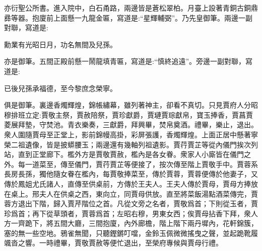\begin{parag}
    亦衍聖公所書。進入院中，白石甬路，兩邊皆是蒼松翠柏。月臺上設著青銅古銅鼎彞等器。抱廈前上面懸一九龍金匾，寫道是:“星輝輔弼”。乃先皇御筆。兩邊一副對聯，寫道是:
\end{parag}


\begin{poem}
    \begin{pl}勳業有光昭日月，功名無間及兒孫。\end{pl}

\end{poem}


\begin{parag}
    亦是御筆。五間正殿前懸一鬧龍填青匾，寫道是:“慎終追遠”。旁邊一副對聯，寫道是:
\end{parag}


\begin{poem}
    \begin{pl}已後兒孫承福德，至今黎庶念榮寧。\end{pl}

\end{poem}


\begin{parag}
    俱是御筆。裏邊香燭輝煌，錦帳繡幕，雖列著神主，卻看不真切。只見賈府人分昭穆排班立定:賈敬主祭，賈赦陪祭，賈珍獻爵，賈璉賈琮獻帛，寶玉捧香，賈菖賈菱展拜墊，守焚池。青衣樂奏，三獻爵，拜興畢，焚帛奠酒。禮畢，樂止，退出。衆人圍隨賈母至正堂上，影前錦幔高掛，彩屏張護，香燭輝煌。上面正居中懸著寧榮二祖遺像，皆是披蟒腰玉；兩邊還有幾軸列祖遺影。賈荇賈芷等從內儀門挨次列站，直到正堂廊下。檻外方是賈敬賈赦，檻內是各女眷。衆家人小廝皆在儀門之外。每一道菜至，傳至儀門，賈荇賈芷等便接了，按次傳至階上賈敬手中。賈蓉系長房長孫，獨他隨女眷在檻內，每賈敬捧菜至，傳於賈蓉，賈蓉便傳於他妻子，又傳於鳳姐尤氏諸人，直傳至供桌前，方傳於王夫人。王夫人傳於賈母，賈母方捧放在桌上。邢夫人在供桌之西，東向立，同賈母供放。直至將菜飯湯點酒菜傳完，賈蓉方退出下階，歸入賈芹階位之首。凡從文旁之名者，賈敬爲首；下則從玉者，賈珍爲首；再下從草頭者，賈蓉爲首；左昭右穆，男東女西；俟賈母拈香下拜，衆人方一齊跪下，將五間大廳，三間抱廈，內外廊檐，階上階下兩丹墀內，花軒錦簇，塞的無一些空地。鴉雀無聞，只聽鏗鏘叮噹，金鈴玉佩微微搖曳之聲，並起跪靴履颯沓之響。一時禮畢，賈敬賈赦等便忙退出，至榮府專候與賈母行禮。
\end{parag}


